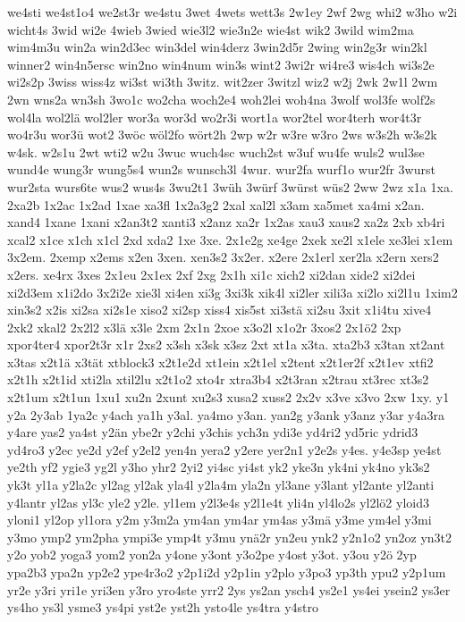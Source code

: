 {we4sti
we4st1o4
we2st3r
we4stu
3wet
4wets
wett3s
2w1ey
2wf
2wg
whi2
w3ho
w2i
wicht4s
3wid
wi2e
4wieb
3wied
wie3l2
wie3n2e
wie4st
wik2
3wild
wim2ma
wim4m3u
win2a
win2d3ec
win3del
win4derz
3win2d5r
2wing
win2g3r
win2kl
winner2
win4n5ersc
win2no
win4num
win3s
wint2
3wi2r
wi4re3
wis4ch
wi3s2e
wi2s2p
3wiss
wiss4z
wi3st
wi3th
3witz.
wit2zer
3witzl
wiz2
w2j
2wk
2w1l
2wm
2wn
wns2a
wn3sh
3wo1c
wo2cha
woch2e4
woh2lei
woh4na
3wolf
wol3fe
wolf2s
wol4la
wol2lä
wol2ler
wor3a
wor3d
wo2r3i
wort1a
wor2tel
wor4terh
wor4t3r
wo4r3u
wor3ü
wot2
3wöc
wöl2fo
wört2h
2wp
w2r
w3re
w3ro
2ws
w3s2h
w3s2k
w4sk.
w2s1u
2wt
wti2
w2u
3wuc
wuch4sc
wuch2st
w3uf
wu4fe
wuls2
wul3se
wund4e
wung3r
wung5s4
wun2s
wunsch3l
4wur.
wur2fa
wurf1o
wur2fr
3wurst
wur2sta
wurs6te
wus2
wus4s
3wu2t1
3wüh
3würf
3würst
wüs2
2ww
2wz
x1a
1xa.
2xa2b
1x2ac
1x2ad
1xae
xa3fl
1x2a3g2
2xal
xal2l
x3am
xa5met
xa4mi
x2an.
xand4
1xane
1xani
x2an3t2
xanti3
x2anz
xa2r
1x2as
xau3
xaus2
xa2z
2xb
xb4ri
xcal2
x1ce
x1ch
x1cl
2xd
xda2
1xe
3xe.
2x1e2g
xe4ge
2xek
xe2l
x1ele
xe3lei
x1em
3x2em.
2xemp
x2ems
x2en
3xen.
xen3s2
3x2er.
x2ere
2x1erl
xer2la
x2ern
xers2
x2ers.
xe4rx
3xes
2x1eu
2x1ex
2xf
2xg
2x1h
xi1c
xich2
xi2dan
xide2
xi2dei
xi2d3em
x1i2do
3x2i2e
xie3l
xi4en
xi3g
3xi3k
xik4l
xi2ler
xili3a
xi2lo
xi2l1u
1xim2
xin3s2
x2is
xi2sa
xi2s1e
xiso2
xi2sp
xiss4
xis5st
xi3stä
xi2su
3xit
x1i4tu
xive4
2xk2
xkal2
2x2l2
x3lä
x3le
2xm
2x1n
2xoe
x3o2l
x1o2r
3xos2
2x1ö2
2xp
xpor4ter4
xpor2t3r
x1r
2xs2
x3sh
x3sk
x3sz
2xt
xt1a
x3ta.
xta2b3
x3tan
xt2ant
x3tas
x2t1ä
x3tät
xtblock3
x2t1e2d
xt1ein
x2t1el
x2tent
x2t1er2f
x2t1ev
xtfi2
x2t1h
x2t1id
xti2la
xtil2lu
x2t1o2
xto4r
xtra3b4
x2t3ran
x2trau
xt3rec
xt3s2
x2t1um
x2t1un
1xu1
xu2n
2xunt
xu2s3
xusa2
xuss2
2x2v
x3ve
x3vo
2xw
1xy.
y1
y2a
2y3ab
1ya2c
y4ach
ya1h
y3al.
ya4mo
y3an.
yan2g
y3ank
y3anz
y3ar
y4a3ra
y4are
yas2
ya4st
y2än
ybe2r
y2chi
y3chis
ych3n
ydi3e
yd4ri2
yd5ric
ydrid3
yd4ro3
y2ec
ye2d
y2ef
y2el2
yen4n
yera2
y2ere
yer2n1
y2e2s
y4es.
y4e3sp
ye4st
ye2th
yf2
ygie3
yg2l
y3ho
yhr2
2yi2
yi4sc
yi4st
yk2
yke3n
yk4ni
yk4no
yk3s2
yk3t
yl1a
y2la2c
yl2ag
yl2ak
yla4l
y2la4m
yla2n
yl3ane
y3lant
yl2ante
yl2anti
y4lantr
yl2as
yl3c
yle2
y2le.
yl1em
y2l3e4s
y2l1e4t
yli4n
yl4lo2s
yl2lö2
yloid3
yloni1
yl2op
yl1ora
y2m
y3m2a
ym4an
ym4ar
ym4as
y3mä
y3me
ym4el
y3mi
y3mo
ymp2
ym2pha
ympi3e
ymp4t
y3mu
ynä2r
yn2eu
ynk2
y2n1o2
yn2oz
yn3t2
y2o
yob2
yoga3
yom2
yon2a
y4one
y3ont
y3o2pe
y4ost
y3ot.
y3ou
y2ö
2yp
ypa2b3
ypa2n
yp2e2
ype4r3o2
y2p1i2d
y2p1in
y2plo
y3po3
yp3th
ypu2
y2p1um
yr2e
y3ri
yri1e
yri3en
y3ro
yro4ste
yrr2
2ys
ys2an
ysch4
ys2e1
ys4ei
ysein2
ys3er
ys4ho
ys3l
ysme3
ys4pi
yst2e
yst2h
ysto4le
ys4tra
y4stro
}
